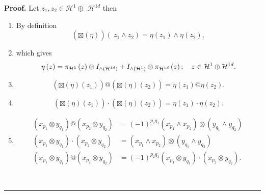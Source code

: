 \documentclass[aps,preprint]{revtex4}%
\newenvironment{proof}[1][Proof]{\noindent\textbf{#1.} }{\ \rule{0.5em}{0.5em}}
\begin{document}
\begin{proof}
Let $z_{1},z_{2}\in\mathcal{H}^{1}\oplus$ $\mathcal{H}^{1d}$ then

\begin{enumerate}
\item By definition
\begin{equation}
\left(  \overset{}{\boxtimes\left(  \eta\right)  }\right)  \left(
\ z_{1}\wedge z_{2}\right)  =\eta\left(  z_{1}\right)  \wedge\eta\left(
z_{2}\right)  ,
\end{equation}


\item which gives
\begin{equation}
\eta\left(  z\right)  =\pi_{\mathcal{H}^{1}}\left(  z\right)  \otimes
I_{{\huge \wedge}\left(  \mathcal{H}^{1d}\right)  }+I_{{\huge \wedge}\left(
\mathcal{H}^{1}\right)  }\otimes\pi_{\mathcal{H}^{1d}}\left(  z\right)  ;\quad
z\in\mathcal{H}^{1}\oplus\mathcal{H}^{1d}.
\end{equation}


\item
\begin{equation}
\left(  \overset{}{\boxtimes\left(  \eta\right)  \left(  z_{1}\right)
}\right)  @\left(  \overset{}{\boxtimes\left(  \eta\right)  \left(
z_{2}\right)  }\right)  =\eta\left(  z_{1}\right)  @\eta\left(  z_{2}\right)
.
\end{equation}


\item
\begin{equation}
\left(  \overset{}{\boxtimes\left(  \eta\right)  \left(  z_{1}\right)
}\right)  \cdot\left(  \overset{}{\boxtimes\left(  \eta\right)  \left(
z_{2}\right)  }\right)  =\eta\left(  z_{1}\right)  \cdot\eta\left(
z_{2}\right)  .
\end{equation}


\item
\begin{align}
\left(  x_{p_{1}}\otimes y_{q_{1}}\right)  @\left(  x_{p_{2}}\otimes y_{q_{2}%
}\right)   &  =\left(  -1\right)  ^{p_{2}q_{1}}\left(  x_{p_{1}}\wedge
x_{p_{2}}\right)  \otimes\left(  y_{q_{1}}\wedge y_{q_{2}}\right)  \ \\
\left(  x_{p_{1}}\otimes y_{q_{1}}\right)  \cdot\left(  x_{p_{2}}\otimes
y_{q_{2}}\right)   &  =\left(  x_{p_{1}}\wedge x_{p_{2}}\right)
\otimes\left(  y_{q_{1}}\wedge y_{q_{2}}\right) \\
\left(  x_{p_{1}}\otimes y_{q_{1}}\right)  @\left(  x_{p_{2}}\otimes y_{q_{2}%
}\right)   &  =\left(  -1\right)  ^{p_{2}q_{1}}\left(  x_{p_{1}}\otimes
y_{q_{1}}\right)  \cdot\left(  x_{p_{2}}\otimes y_{q_{2}}\right)  .
\end{align}



\end{enumerate}
\end{proof}
\end{document}
